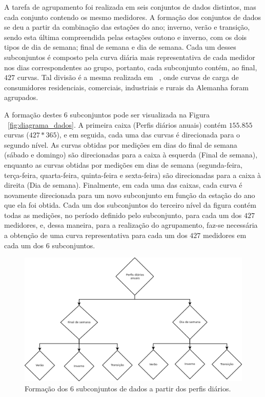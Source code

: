 A tarefa de agrupamento foi realizada em seis conjuntos de dados distintos, mas cada conjunto contendo os mesmo medidores. A formação dos conjuntos de dados se deu a partir da combinação das estações do ano; inverno, verão e transição, sendo esta última compreendida pelas estações outono e inverno, com os dois tipos de dia de semana; final de semana e dia de semana. Cada um desses subconjuntos é composto pela curva diária mais representativa de cada medidor nos dias correspondentes ao grupo, portanto, cada subconjunto contém, ao final, $427$ curvas. Tal divisão é a mesma realizada em ~\parencite{Flath2012}, onde curvas de carga de consumidores residenciais, comerciais, industriais e rurais da Alemanha foram agrupados.

A formação destes $6$ subconjuntos pode ser visualizada na Figura ~\ref{fig:diagrama_dados}. A primeira caixa (Perfis diários anuais) contém $155.855$ curvas ($427*365$), e em seguida, cada uma das curvas é direcionada para o segundo nível. As curvas obtidas por medições em dias do final de semana (sábado e domingo) são direcionadas para a caixa à esquerda (Final de semana), enquanto as curvas obtidas por medições em dias de semana (segunda-feira, terça-feira, quarta-feira, quinta-feira e sexta-feira) são direcionadas para a caixa à direita (Dia de semana). Finalmente, em cada uma das caixas, cada curva é novamente direcionada para um novo subconjunto em função da estação do ano que ela foi obtida. Cada um dos subconjuntos do terceiro nível da figura contém todas as medições, no período definido pelo subconjunto, para cada um dos $427$ medidores, e, dessa maneira, para a realização do agrupamento, faz-se necessária a obtenção de uma curva representativa para cada um dos $427$ medidores em cada um dos $6$ subconjuntos.

 \begin{figure}
	\includegraphics[width=\linewidth]{figuras/diagrama_dados.png}
	\caption{Formação dos $6$ subconjuntos de dados a partir dos perfis diários.}
\end{figure} \label{fig:diagrama_dados}

